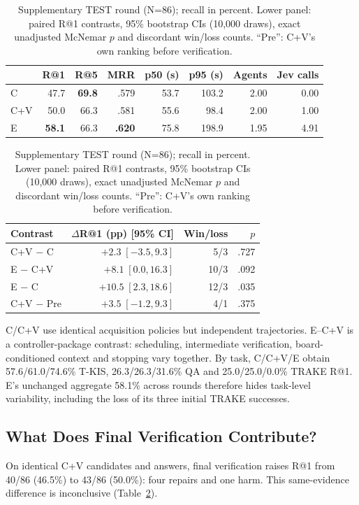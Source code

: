 \documentclass[runningheads]{llncs}
\begin{document}
\begin{table}[t]
\caption{Supplementary TEST round (N=86); recall in percent. Lower panel: paired R@1 contrasts, 95\% bootstrap CIs (10,000 draws), exact unadjusted McNemar $p$ and discordant win/loss counts. ``Pre'': C+V's own ranking before verification.}
\label{tab:cv}
\centering
\footnotesize
\setlength{\tabcolsep}{5pt}
\begin{tabular}{@{}lrrrrrrr@{}}
\toprule
& R@1 & R@5 & MRR & p50 (s) & p95 (s) & Agents & Jev calls\\
\midrule
C & 47.7 & \textbf{69.8} & .579 & 53.7 & 103.2 & 2.00 & 0.00\\
C+V & 50.0 & 66.3 & .581 & 55.6 & 98.4 & 2.00 & 1.00\\
E & \textbf{58.1} & 66.3 & \textbf{.620} & 75.8 & 198.9 & 1.95 & 4.91\\
\bottomrule
\end{tabular}
\smallskip

\begin{tabular}{@{}lrrr@{}}
\toprule
Contrast & $\Delta$R@1 (pp) [95\% CI] & Win/loss & $p$\\
\midrule
C+V $-$ C & $+2.3\;[-3.5,9.3]$ & 5/3 & .727\\
E $-$ C+V & $+8.1\;[0.0,16.3]$ & 10/3 & .092\\
E $-$ C & $+10.5\;[2.3,18.6]$ & 12/3 & .035\\
C+V $-$ Pre & $+3.5\;[-1.2,9.3]$ & 4/1 & .375\\
\bottomrule
\end{tabular}
\end{table}

C/C+V use identical acquisition policies but independent trajectories. E--C+V is a controller-package contrast: scheduling, intermediate verification, board-conditioned context and stopping vary together. By task, C/C+V/E obtain 57.6/61.0/74.6\% T-KIS, 26.3/26.3/31.6\% QA and 25.0/25.0/0.0\% TRAKE R@1. E's unchanged aggregate 58.1\% across rounds therefore hides task-level variability, including the loss of its three initial TRAKE successes.

\subsection{What Does Final Verification Contribute?}
\label{sec:ranking-diagnostic}
On identical C+V candidates and answers, final verification raises R@1 from 40/86 (46.5\%) to 43/86 (50.0\%): four repairs and one harm. This same-evidence difference is inconclusive (Table~\ref{tab:cv}).
\end{document}
